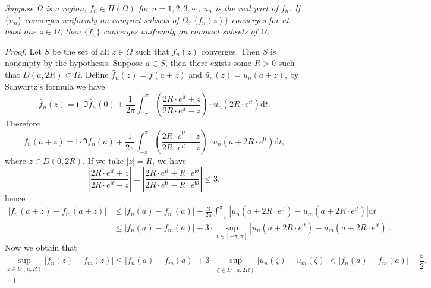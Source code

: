 \begin{problem}\em
Suppose $\Omega$ is a region, $f_n\in H(\Omega)$ for $n=1,2,3,\cdots$, $u_n$ is the real part of $f_n$. If $\{u_n\}$ converges uniformly on compact subsets of $\Omega$, $\{f_n(z)\}$ converges for at least one $z\in\Omega$, then $\{f_n\}$ converges uniformly on compact subsets of $\Omega$.
\end{problem}
\begin{proof}
Let $S$ be the set of all $z\in\Omega$ such that $f_n(z)$ converges. Then $S$ is nonempty by the hypothesis. Suppose $a\in S$, then there exists some $R>0$ such that $D(a,2R)\subset\Omega$. Define $\widetilde{f_n}(z)=f(a+z)$ and $\widetilde{u_n}(z)=u_n(a+z)$, by Schwartz's formula we have 
$$
\widetilde{f_n}\left( z \right) =\mathrm{i}\cdot \Im \widetilde{f_n}\left( 0 \right) +\frac{1}{2\pi}\int_{-\pi}^{\pi}{\left( \frac{2R\cdot e^{\mathrm{i}t}+z}{2R\cdot e^{\mathrm{i}t}-z} \right) \cdot \widetilde{u_n}\left( 2R\cdot e^{\mathrm{i}t} \right) \mathrm{d}t}.
$$
Therefore 
$$
f_n\left( a+z \right) =\mathrm{i}\cdot \Im f_n\left( a \right) +\frac{1}{2\pi}\int_{-\pi}^{\pi}{\left( \frac{2R\cdot e^{\mathrm{i}t}+z}{2R\cdot e^{\mathrm{i}t}-z} \right) \cdot u_n\left( a+2R\cdot e^{\mathrm{i}t} \right) \mathrm{d}t},
$$
where $z\in D(0,2R)$. If we take $|z|=R$, we have 
$$
\left| \frac{2R\cdot e^{\mathrm{i}t}+z}{2R\cdot e^{\mathrm{i}t}-z} \right|=\left| \frac{2R\cdot e^{\mathrm{i}t}+R\cdot e^{\mathrm{i}\theta}}{2R\cdot e^{\mathrm{i}t}-R\cdot e^{\mathrm{i}\theta}} \right|\le 3,
$$
hence 
$$
\begin{aligned}
\left| f_n\left( a+z \right) -f_m\left( a+z \right) \right|&\le \left| f_n\left( a \right) -f_m\left( a \right) \right|+\frac{3}{2\pi}\int_{-\pi}^{\pi}{\left| u_n\left( a+2R\cdot e^{\mathrm{i}t} \right) -u_m\left( a+2R\cdot e^{\mathrm{i}t} \right) \right|\mathrm{d}t}
\\
&\le \left| f_n\left( a \right) -f_m\left( a \right) \right|+3\cdot \mathop {\mathrm{sup}} \limits_{t\in \left[ -\pi ,\pi \right]}\left| u_n\left( a+2R\cdot e^{\mathrm{i}t} \right) -u_m\left( a+2R\cdot e^{\mathrm{i}t} \right) \right|.
\end{aligned}
$$
Now we obtain that 
$$
\mathop {\mathrm{sup}} \limits_{z\in D\left( a,R \right)}\left| f_n\left( z \right) -f_m\left( z \right) \right|\le \left| f_n\left( a \right) -f_m\left( a \right) \right|+3\cdot \mathop {\mathrm{sup}} \limits_{\zeta \in \overline{D}\left( a,2R \right)}\left| u_n\left( \zeta \right) -u_m\left( \zeta \right) \right|<\left| f_n\left( a \right) -f_m\left( a \right) \right|+\frac{\varepsilon}{2}.
$$
\end{proof}
